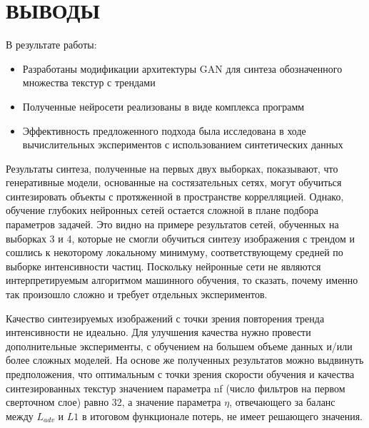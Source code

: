 \clearpage
\section*{\hfil ВЫВОДЫ \hfil}
	В результате работы:
	\begin{itemize}
		\item Разработаны модификации архитектуры GAN для синтеза обозначенного множества текстур с трендами
		\item Полученные нейросети реализованы в виде комплекса программ
		\item Эффективность предложенного подхода была исследована в ходе вычислительных экспериментов с использованием синтетических данных
	\end{itemize}
	Результаты синтеза, полученные на первых двух выборках, показывают, что генеративные модели, основанные на состязательных сетях, могут обучиться синтезировать объекты с протяженной в пространстве коррелляцией. Однако, обучение глубоких нейронных сетей остается сложной в плане подбора параметров задачей. Это видно на примере результатов сетей, обученных на выборках 3 и 4, которые не смогли обучиться синтезу изображения с трендом и сошлись к некоторому локальному минимуму, соответствующему средней по выборке интенсивности частиц. Поскольку нейронные сети не являются интерпретируемым алгоритмом машинного обучения, то сказать, почему именно так произошло сложно и требует отдельных экспериментов.
	
	Качество синтезируемых изображений с точки зрения повторения тренда интенсивности не идеально. Для улучшения качества нужно провести дополнительные эксперименты, с обучением на большем объеме данных и/или более сложных моделей. На основе же полученных результатов можно выдвинуть предположения, что оптимальным с точки зрения скорости обучения и качества синтезированных текстур значением параметра nf (число фильтров на первом сверточном слое) равно 32, а значение параметра $\eta$, отвечающего за баланс между $L_{adv}$ и $L1$ в итоговом функционале потерь, не имеет решающего значения.